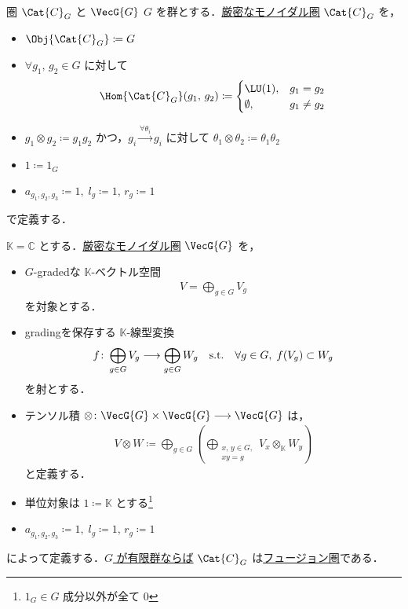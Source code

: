\documentclass[TQFT_main]{subfiles}
\begin{document}
\begin{myexample}[label=def:CG]{圏 $\Cat{C}_G$ と $\VecG{G}$}
    $G$ を群とする．\hyperref[redef:monoidal-category]{厳密なモノイダル圏} $\Cat{C}_G$ を，
    \begin{itemize}
        \item $\Obj{\Cat{C}_G} \coloneqq G$
        \item $\forall g_1,\, g_2 \in G$ に対して
        \begin{align}
            \Hom{\Cat{C}_G}(g_1,\, g_2) \coloneqq 
            \begin{cases}
                \LU(1), &g_1 = g_2 \\
                \emptyset, &g_1 \neq g_2
            \end{cases}
        \end{align}
        \item $g_1 \otimes g_2 \coloneqq g_1 g_2$ かつ，$g_i \xrightarrow{\forall \theta_i}  g_i$ に対して $\theta_1 \otimes \theta_2 \coloneqq \theta_1 \theta_2$
        \item $1 \coloneqq 1_G$
        \item $a_{g_1,g_2,g_3} \coloneqq 1,\; l_{g} \coloneqq 1,\, r_g \coloneqq 1$
    \end{itemize}
    で定義する．
    
    $\mathbb{K} = \mathbb{C}$ とする．\hyperref[redef:monoidal-category]{厳密なモノイダル圏} $\VecG{G}$ を，
    \begin{itemize}
        \item $G$-gradedな $\mathbb{K}$-ベクトル空間
        \begin{align}
            V = \bigoplus_{g \in G} V_g
        \end{align}
        を対象とする．
        \item gradingを保存する $\mathbb{K}$-線型変換
        \begin{align}
            f \colon \bigoplus_{g \in G} V_g \longrightarrow \bigoplus_{g \in G} W_g \quad \mathrm{s.t.} \quad \forall g \in G,\; f (V_g) \subset W_g
        \end{align}
        を射とする．
        \item テンソル積 $\otimes \colon \VecG{G} \times \VecG{G} \lto \VecG{G}$ は，
        \begin{align}
            V \otimes W \coloneqq \bigoplus_{g \in G} \left( \bigoplus_{\substack{x,\, y \in G, \\ xy = g}} V_x \otimes_{\mathbb{K}} W_y\right)
        \end{align}
        と定義する．
        \item 単位対象は $1 \coloneqq \mathbb{K}$ とする\footnote{$1_G \in G$ 成分以外が全て $0$}
        \item $a_{g_1,g_2,g_3} \coloneqq 1,\; l_{g} \coloneqq 1,\, r_g \coloneqq 1$
    \end{itemize}
    によって定義する．\underline{$G$ が有限群ならば} $\Cat{C}_G$ は\hyperref[def:tensorfusion-cat]{フュージョン圏}である．
\end{myexample}
\end{document}
